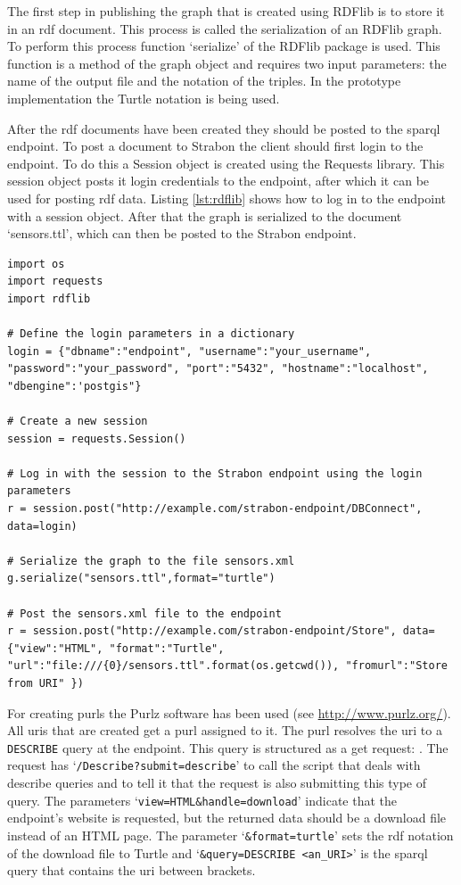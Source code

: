 The first step in publishing the graph that is created using RDFlib is to store it in an \ac{rdf} document. This process is called the serialization of an RDFlib graph. To perform this process function `serialize' of the RDFlib package is used. This function is a method of the graph object and requires two input parameters: the name of the output file and the notation of the triples. In the prototype implementation the Turtle notation is being used. 

After the \ac{rdf} documents have been created they should be posted to the \ac{sparql} endpoint. To post a document to Strabon the client should first login to the endpoint. To do this a Session object is created using the Requests library. This session object posts it login credentials to the endpoint, after which it can be used for posting \ac{rdf} data. Listing \ref{lst:rdflib} shows how to log in to the endpoint with a session object. After that the graph is serialized to the document `sensors.ttl', which can then be posted to the Strabon endpoint.   

\begin{lstlisting}[float,caption={Serializing the RDFlib graph object and posting it to the Strabon endpoint}, label={lst:rdflib}]
import os
import requests
import rdflib

# Define the login parameters in a dictionary
login = {"dbname":"endpoint", "username":"your_username", "password":"your_password", "port":"5432", "hostname":"localhost", "dbengine":'postgis"}

# Create a new session
session = requests.Session()

# Log in with the session to the Strabon endpoint using the login parameters
r = session.post("http://example.com/strabon-endpoint/DBConnect", data=login)

# Serialize the graph to the file sensors.xml
g.serialize("sensors.ttl",format="turtle")

# Post the sensors.xml file to the endpoint
r = session.post("http://example.com/strabon-endpoint/Store", data={"view":"HTML", "format":"Turtle", "url":"file:///{0}/sensors.ttl".format(os.getcwd()), "fromurl":"Store from URI" }) 
\end{lstlisting}  


For creating \aclp{purl} the Purlz software has been used (see \url{http://www.purlz.org/}). All \acp{uri} that are created get a \ac{purl} assigned to it. The \ac{purl} resolves the \ac{uri} to a \texttt{DESCRIBE} query at the endpoint. This query is structured as a get request: \texttt{}. The request has `\texttt{/Describe?submit=describe}' to call the script that deals with describe queries and to tell it that the request is also submitting this type of query. The parameters `\texttt{view=HTML\&handle=download}' indicate that the endpoint's website is requested, but the returned data should be a download file instead of an HTML page. The parameter `\texttt{\&format=turtle}' sets the \ac{rdf} notation of the download file to Turtle and `\texttt{\&query=DESCRIBE <an\_URI>}' is the \ac{sparql} query that contains the \ac{uri} between brackets. 

